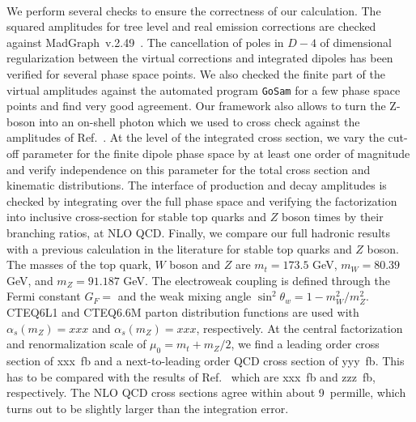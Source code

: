 \documentclass[preprint]{JHEP3} %
\begin{document}
\\
We perform several checks to ensure the correctness of our calculation. 
The squared amplitudes for tree level and real emission corrections are checked against MadGraph~v.2.49~\cite{Stelzer:1994ta}. 
The cancellation of poles in $D-4$ of dimensional regularization between the virtual corrections and integrated dipoles has been verified for several phase space points.
We also checked the finite part of the virtual amplitudes against the automated program {\tt GoSam} \cite{Cullen:2011ac} for a few phase space points and find
very good agreement. 
Our framework also allows to turn the Z-boson into an on-shell photon which we used to cross check against the amplitudes of Ref.~\cite{Melnikov.Scharf}. 
At the level of the integrated cross section, we vary the cut-off parameter for the finite dipole phase space by at least one order of magnitude and 
verify independence on this parameter for the total cross section and kinematic distributions.
The interface of production and decay amplitudes is checked by integrating over the full phase space and verifying the factorization into 
inclusive cross-section for stable top quarks and $Z$ boson times by their branching ratios, at NLO QCD.
% 
Finally, we compare our full hadronic results with a previous calculation \cite{1208} in the literature for stable top quarks and $Z$ boson.
The masses of the top quark, $W$ boson and $Z$ are $m_t=173.5$ GeV, $m_W=80.39$ GeV, and $m_Z=91.187$ GeV. 
The electroweak coupling is defined through the Fermi constant $G_F=$ and the weak mixing angle $\sin^2\theta_w = 1-m_W^2/m_Z^2$. 
CTEQ6L1 \cite{} and CTEQ6.6M \cite{} parton distribution functions are used with $\alpha_s(m_Z)=xxx$ and $\alpha_s(m_Z)=xxx$, respectively. 
At the central factorization and renormalization scale of $\mu_0=m_t+m_Z/2$, 
we find a leading order cross section of xxx~fb and a next-to-leading order QCD cross section of yyy~fb. 
This has to be compared with the results of Ref.~\cite{1208} which are xxx~fb and zzz~fb, respectively.
The NLO QCD cross sections agree within about 9~permille, which turns out to be slightly larger than the integration error.
\end{document}
